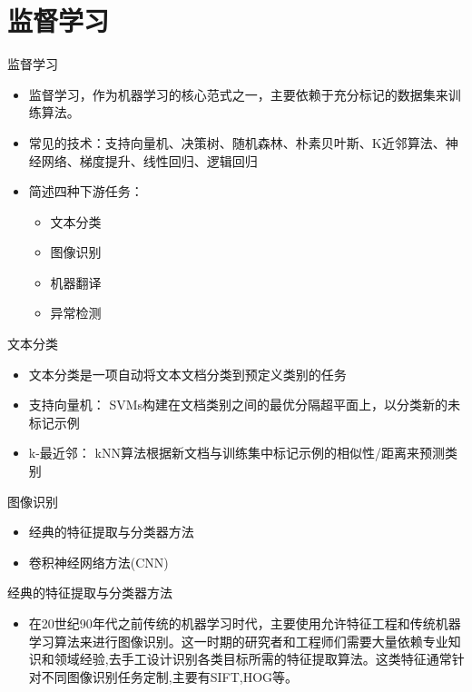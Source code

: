 \documentclass[UTF8,AutoFakeBold,AutoFakeSlant]{beamer}
\begin{document}
\section{监督学习}
\begin{frame}{监督学习}
    \begin{itemize}
        \item 监督学习，作为机器学习的核心范式之一，主要依赖于充分标记的数据集来训练算法。
        \item 常见的技术：支持向量机、决策树、随机森林、朴素贝叶斯、K近邻算法、神经网络、梯度提升、线性回归、逻辑回归
        \item 简述四种下游任务：
              \begin{itemize}
                  \item 文本分类
                  \item 图像识别
                  \item 机器翻译
                  \item 异常检测
              \end{itemize}
    \end{itemize}
\end{frame}

\begin{frame}{文本分类}
    \small
    \begin{itemize}
        \item 文本分类是一项自动将文本文档分类到预定义类别的任务
        \item 支持向量机： SVMs构建在文档类别之间的最优分隔超平面上，以分类新的未标记示例
        \item k-最近邻： kNN算法根据新文档与训练集中标记示例的相似性/距离来预测类别
    \end{itemize}
\end{frame}

\begin{frame}{图像识别}
    \begin{itemize}
        \item 经典的特征提取与分类器方法
        \item 卷积神经网络方法(CNN)

    \end{itemize}
\end{frame}

\begin{frame}{经典的特征提取与分类器方法}
    \begin{itemize}
        \item 在20世纪90年代之前传统的机器学习时代，主要使用允许特征工程和传统机器学习算法来进行图像识别。这一时期的研究者和工程师们需要大量依赖专业知识和领域经验,去手工设计识别各类目标所需的特征提取算法。这类特征通常针对不同图像识别任务定制,主要有SIFT,HOG等。
    \end{itemize}
\end{frame}
\end{document}
